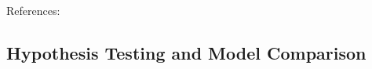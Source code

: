 References:
\bi
 \I 
\ei   



\subsection{Hypothesis Testing and Model Comparison} \label{subsec:model_comparison_lit}





